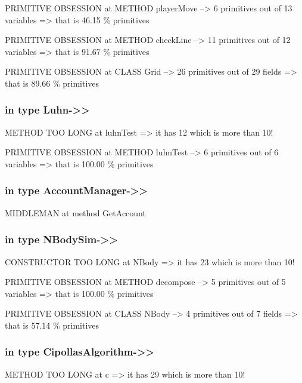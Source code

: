 \documentclass[a4paper]{article}
\begin{document}
\begin{flushleft}
	PRIMITIVE OBSESSION at METHOD playerMove --\textgreater{} 6 primitives
	out of 13 variables =\textgreater{} that is 46.15 \% primitives

	PRIMITIVE OBSESSION at METHOD checkLine --\textgreater{} 11 primitives
	out of 12 variables =\textgreater{} that is 91.67 \% primitives

	PRIMITIVE OBSESSION at CLASS Grid --\textgreater{} 26 primitives out of
	29 fields =\textgreater{} that is 89.66 \% primitives

	\subsubsection{in type Luhn-\textgreater{}\textgreater{}}\label{in-type-luhn-}

	METHOD TOO LONG at luhnTest =\textgreater{} it has 12 which is more than
	10!

	PRIMITIVE OBSESSION at METHOD luhnTest --\textgreater{} 6 primitives out
	of 6 variables =\textgreater{} that is 100.00 \% primitives

	\subsubsection{in type
		AccountManager-\textgreater{}\textgreater{}}\label{in-type-accountmanager-}

	MIDDLEMAN at method GetAccount

	\subsubsection{in type
		NBodySim-\textgreater{}\textgreater{}}\label{in-type-nbodysim-}

	CONSTRUCTOR TOO LONG at NBody =\textgreater{} it has 23 which is more
	than 10!

	PRIMITIVE OBSESSION at METHOD decompose --\textgreater{} 5 primitives
	out of 5 variables =\textgreater{} that is 100.00 \% primitives

	PRIMITIVE OBSESSION at CLASS NBody --\textgreater{} 4 primitives out of
	7 fields =\textgreater{} that is 57.14 \% primitives

	\subsubsection{in type
		CipollasAlgorithm-\textgreater{}\textgreater{}}\label{in-type-cipollasalgorithm-}

	METHOD TOO LONG at c =\textgreater{} it has 29 which is more than 10!


\end{flushleft}
\end{document}
